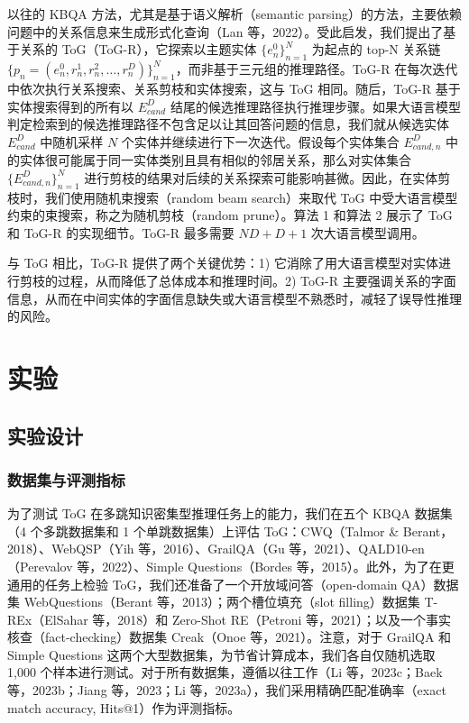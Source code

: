 \documentclass[11pt,UTF8,fontset=fandol]{ctexart}
\begin{document}
以往的 KBQA 方法，尤其是基于语义解析（semantic parsing）的方法，主要依赖问题中的关系信息来生成形式化查询（Lan 等，2022）。受此启发，我们提出了基于关系的 ToG（ToG-R），它探索以主题实体 $\{e_n^0\}_{n=1}^N$ 为起点的 top-N 关系链 $\{p_n = (e_n^0, r_n^1, r_n^2, \dots, r_n^D)\}_{n=1}^N$，而非基于三元组的推理路径。ToG-R 在每次迭代中依次执行关系搜索、关系剪枝和实体搜索，这与 ToG 相同。随后，ToG-R 基于实体搜索得到的所有以 $E_{cand}^D$ 结尾的候选推理路径执行推理步骤。如果大语言模型判定检索到的候选推理路径不包含足以让其回答问题的信息，我们就从候选实体 $E_{cand}^D$ 中随机采样 $N$ 个实体并继续进行下一次迭代。假设每个实体集合 $E_{cand,n}^D$ 中的实体很可能属于同一实体类别且具有相似的邻居关系，那么对实体集合 $\{E_{cand,n}^D\}_{n=1}^N$ 进行剪枝的结果对后续的关系探索可能影响甚微。因此，在实体剪枝时，我们使用随机束搜索（random beam search）来取代 ToG 中受大语言模型约束的束搜索，称之为随机剪枝（random prune）。算法 1 和算法 2 展示了 ToG 和 ToG-R 的实现细节。ToG-R 最多需要 $ND + D + 1$ 次大语言模型调用。

与 ToG 相比，ToG-R 提供了两个关键优势：1) 它消除了用大语言模型对实体进行剪枝的过程，从而降低了总体成本和推理时间。2) ToG-R 主要强调关系的字面信息，从而在中间实体的字面信息缺失或大语言模型不熟悉时，减轻了误导性推理的风险。

\section{实验}
\subsection{实验设计}

\subsubsection{数据集与评测指标}

为了测试 ToG 在多跳知识密集型推理任务上的能力，我们在五个 KBQA 数据集（4 个多跳数据集和 1 个单跳数据集）上评估 ToG：CWQ（Talmor \& Berant，2018）、WebQSP（Yih 等，2016）、GrailQA（Gu 等，2021）、QALD10-en（Perevalov 等，2022）、Simple Questions（Bordes 等，2015）。此外，为了在更通用的任务上检验 ToG，我们还准备了一个开放域问答（open-domain QA）数据集 WebQuestions（Berant 等，2013）；两个槽位填充（slot filling）数据集 T-REx（ElSahar 等，2018）和 Zero-Shot RE（Petroni 等，2021）；以及一个事实核查（fact-checking）数据集 Creak（Onoe 等，2021）。注意，对于 GrailQA 和 Simple Questions 这两个大型数据集，为节省计算成本，我们各自仅随机选取 1{,}000 个样本进行测试。对于所有数据集，遵循以往工作（Li 等，2023c；Baek 等，2023b；Jiang 等，2023；Li 等，2023a），我们采用精确匹配准确率（exact match accuracy, Hits@1）作为评测指标。
\end{document}
